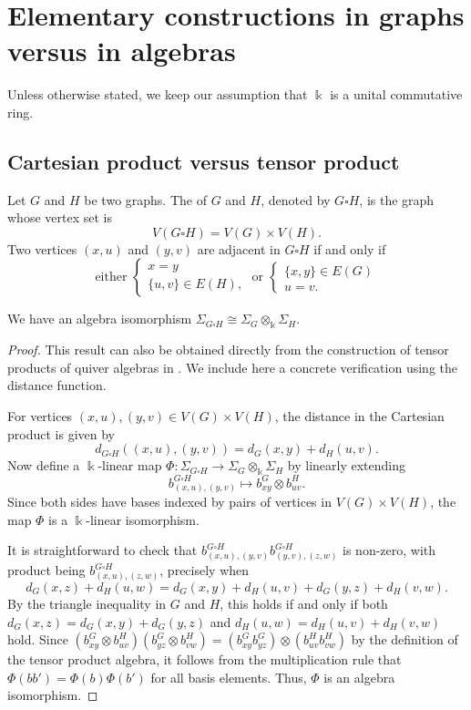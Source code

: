 \documentclass[a4paper,leqno]{amsart}
\begin{document}
\section{Elementary constructions in graphs versus in algebras}\label{sec:3-constr}

Unless otherwise stated, we keep our assumption that $\Bbbk$ is a unital commutative ring.

\subsection{Cartesian product versus tensor product}
\begin{dfn}
Let $G$ and $H$ be two graphs. The  of $G$ and $H$, denoted by $G\square H$, is the graph whose vertex set is
$$V(G\square H)=V(G)\times V(H).$$
Two vertices $(x,u)$ and $(y,v)$ are adjacent in $G\square H$ if and only if
\[
\text{either }\begin{cases}
x=y\\ \{u,v\}\in E(H),
\end{cases}\; \text{or }
\begin{cases}
 \{x,y\}\in E(G)\\u=v.
\end{cases}
\]
\end{dfn}

\begin{prop}\label{prop:tensor}
We have an algebra isomorphism
$\Sigma_{G\square H}\cong \Sigma_G\otimes_{\Bbbk} \Sigma_H$.
\end{prop}

\begin{proof}
This result can also be obtained directly from the construction of tensor products of quiver algebras in \cite[Proposition 3]{Her08}. We include here a concrete verification using the distance function.

For vertices $(x,u),(y,v)\in V(G)\times V(H)$, the distance in the Cartesian product is given by
$$d_{G\square H}((x,u),(y,v))=d_G(x,y)+d_H(u,v).$$
Now define a $\Bbbk$-linear map $\Phi:\Sigma_{G\square H}\longrightarrow \Sigma_G\otimes_{\Bbbk} \Sigma_H$ by linearly extending
$$b^{G\square H}_{(x,u),(y,v)}\mapsto b^G_{xy}\otimes b^H_{uv}.$$
Since both sides have bases indexed by pairs of vertices in $V(G)\times V(H)$, the map $\Phi$ is a $\Bbbk$-linear isomorphism.


It is straightforward to check that $b^{G\square H}_{(x,u),(y,v)}b^{G\square H}_{(y,v),(z,w)}$ is non-zero, with product being $b^{G\square H}_{(x,u),(z,w)}$, precisely when
$$d_G(x,z)+d_H(u,w)=d_G(x,y)+d_H(u,v)+d_G(y,z)+d_H(v,w).$$
By the triangle inequality in $G$ and $H$, this holds if and only if both $d_G(x,z)=d_G(x,y)+d_G(y,z)$ and $d_H(u,w)=d_H(u,v)+d_H(v,w)$ hold.
Since $(b^G_{xy}\otimes b^H_{uv})(b^G_{yz}\otimes b^H_{vw})=(b^G_{xy}b^G_{yz})\otimes (b^H_{uv}b^H_{vw})$ by the definition of the tensor product algebra, it follows from the multiplication rule that $\Phi(bb')=\Phi(b)\Phi(b')$ for all basis elements.
Thus, $\Phi$ is an algebra isomorphism.
\end{proof}
\end{document}
